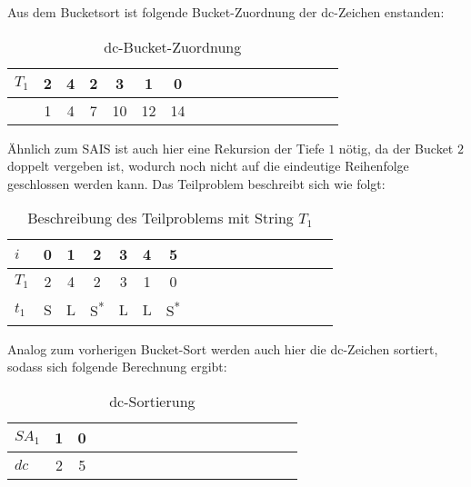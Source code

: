 \noindent Aus dem Bucketsort ist folgende Bucket-Zuordnung der dc-Zeichen enstanden:

\begin{table}[H]
\centering
  \begin{tabular}{ | l | c | c | c | c | c | c | c | c | c | c | c | c | c | c | c | c | }
    \hline
        $T_1$ & 2 & 4 & 2 & 3 & 1 & 0 \\ \hline
              & 1 & 4 & 7 & 10 & 12 & 14  \\
    \hline
  \end{tabular}
  \caption{dc-Bucket-Zuordnung}
\end{table}
\bigskip
Ähnlich zum SAIS ist auch hier eine Rekursion der Tiefe $1$ nötig, da der Bucket $2$ doppelt vergeben ist, wodurch noch nicht auf die eindeutige Reihenfolge geschlossen werden kann. Das Teilproblem beschreibt sich wie folgt:

\begin{table}[H]
\centering
  \begin{tabular}{ | l | c | c | c | c | c | c | c | c | c | c | c | c | c | c | c | c | }
    \hline
        $i$ & 0 & 1 & 2 & 3 & 4 & 5 \\ \hline
      $T_1$ & 2 & 4 & 2 & 3 & 1 & 0  \\ \hline
      $t_1$ & S & L & S\textsuperscript{*} & L & L & S\textsuperscript{*} \\
    \hline
  \end{tabular}
  \caption{Beschreibung des Teilproblems mit String $T_1$}
\end{table}
\bigskip

\noindent Analog zum vorherigen Bucket-Sort werden auch hier die dc-Zeichen sortiert, sodass sich folgende Berechnung ergibt:

\begin{table}[H]
\centering
  \begin{tabular}{ | l | c | c | c | c | c | c | c | c | c | c | c | c | c | c | c | c | }
    \hline
        $SA_1$ & 1 & 0 \\ \hline
        $dc$ & 2 & 5 \\
    \hline
  \end{tabular}
  \caption{dc-Sortierung}
\end{table}
\bigskip

